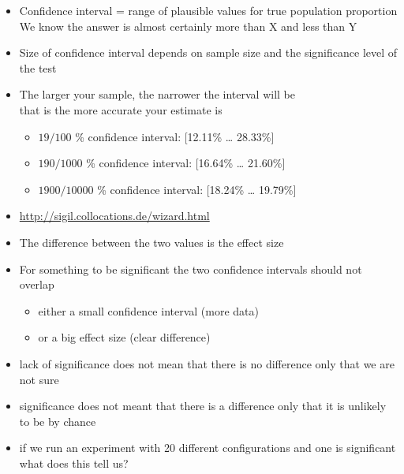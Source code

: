 \documentclass[a4paper,landscape,headrule,footrule,xetex]{foils}
\begin{document}
\begin{itemize}
\item Confidence interval = range of plausible values
for true population proportion
\\ We know the answer is almost certainly more than X and less than Y
\item Size of confidence interval depends on sample
size and the significance level of the test
\item The larger your sample, the narrower the interval will be
\\ that is the more accurate your estimate is
\begin{itemize}
\item $19/100$ \% confidence interval: 	[12.11\% … 28.33\%] 
\item $190/1000$ \% confidence interval: [16.64\% … 21.60\%] 
\item $1900/10000$ \% confidence interval: [18.24\% … 19.79\%] 
\end{itemize}
\item \url{http://sigil.collocations.de/wizard.html}
\end{itemize}
\begin{itemize}
\item The difference between the two values is the effect size
\item For something to be significant the two confidence intervals
  should not overlap
  \begin{itemize}
  \item either a small confidence interval (more data)
  \item or a big effect size (clear difference)
  \end{itemize}
\item lack of significance does not mean that there is no difference
  only that we are not sure
\item significance does not meant that there is a difference only that
  it is unlikely to be by chance
\item if we run an experiment with 20 different configurations and one
  is significant what does this tell us?

\end{itemize}
\end{document}
